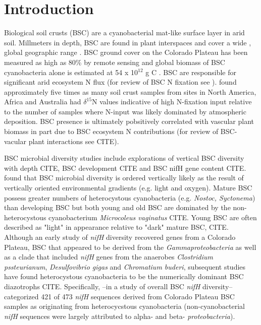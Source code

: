 \section{Introduction}


Biological soil crusts (BSC) are a cyanobacterial mat-like surface layer in arid soil. Millmeters in depth, BSC are found in plant interspaces and cover a wide , global geographic range \cite{garcia2003estimates}. BSC ground cover on the Colorado Plateau has been measured as high as 80\% by remote sensing \cite{karnieli2001} and global biomass of BSC cyanobacteria alone is estimated at 54 x 10$^{12}$ g C \cite{garcia2003estimates}. BSC are responsible for significant arid ecosystem N flux (for review of BSC N fixation see \citet{belnap2003}). \citet{Evans_1999} found approximately five times as many soil crust samples from sites in North America, Africa and Australia had $\delta^{15}$N values indicative of high N-fixation input relative to the number of samples where N-input was likely dominated by atmospheric deposition. BSC presence is ultimately pobsitively correlated with vascular plant biomass in part due to BSC ecosystem N contributions (for review of BSC-vacular plant interactions see CITE).

BSC microbial diversity studies include explorations of vertical BSC diversity with depth CITE, BSC development CITE and BSC nifH gene content CITE. \citet{Garcia_Pichel_2003} found that BSC microbial diversity is ordered vertically likely as the result of vertically oriented environmental gradients (e.g. light and oxygen). Mature BSC possess greater numbers of heterocystous cyanobacteria (e.g. \textit{Nostoc, Syctonema}) than developing BSC but both young and old BSC are dominated by the non-heterocystous cyanobacterium \textit{Microcoleus vaginatus} CITE. Young BSC are often described as "light" in appearance relative to "dark" mature BSC, CITE.  Although an early study of \textit{nifH} diversity recovered genes from a Colorado Plateau, BSC that appeared to be derived from the \textit{Gammaproteobacteria} as well as a clade that included \textit{nifH} genes from the anaerobes \textit{Clostridium pssteurianum}, \textit{Desulfovibrio gigas} and \textit{Chromatium buderi}, subsequent studies have found heterocystous cyanobacteria to be the numerically dominant BSC diazotrophs CITE. Specifically, \citet{Yeager}--in a study of overall BSC \textit{nifH} diversity--categorized 421 of 473 \textit{nifH} sequences derived from Colorado Plateau BSC samples as originating from heterocycstous cyanobacteria (non-cyanobacterial \textit{nifH} sequences were largely attributed to alpha- and beta- \textit{proteobacteria}).

